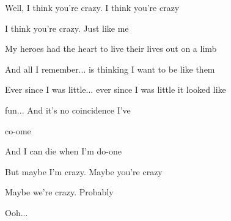 \begin{song}
\bigskip

Well, I think you're crazy. I think you're crazy \par
I think you're crazy. Just like me  \par

\bigskip

 My heroes had the heart to live their lives out on a limb  \par
And all I remember... is thinking I want to be like them  \par

\bigskip

 Ever since I was little... ever since I was little it looked like \par
{}fun... And it's no coincidence I've \par
co-ome  \par
And I can die when I'm do-one  \par

\bigskip

But maybe I'm crazy. Maybe you're crazy \par
Maybe we're crazy. Probably  \par

\bigskip

 Ooh...     \par
{} \par

\end{song}
